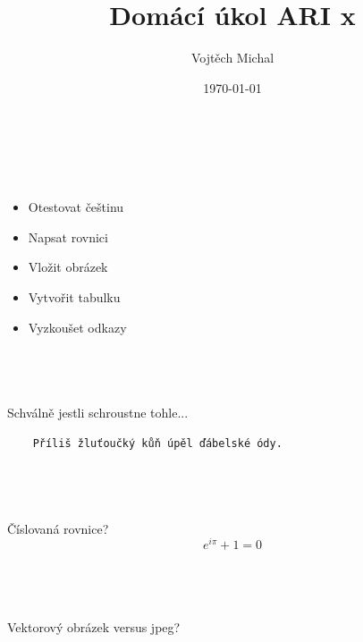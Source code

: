 \documentclass[twoside]{article}
\title{Domácí úkol ARI x}
\author{Vojtěch Michal}
\date{\today}
\begin{document}
\maketitle

\section{~}
\label{sec:ukol1}

\begin{itemize}
\item Otestovat češtinu
\item Napsat rovnici
\item Vložit obrázek
\item Vytvořit tabulku
\item Vyzkoušet odkazy
\end{itemize}

\subsection{~}
\label{sec:Cz}
Schválně jestli schroustne tohle...
\begin{verbatim}
	Příliš žluťoučký kůň úpěl ďábelské ódy.
\end{verbatim}

\subsection{~}
Číslovaná rovnice?
\label{sec:Eq}
\begin{equation}
e^{i \pi} + 1 = 0
\label{eq:TheMostFamousFormula}
\end{equation}

\subsection{~}
\label{sec:Img}
Vektorový obrázek versus jpeg?
\end{document}
